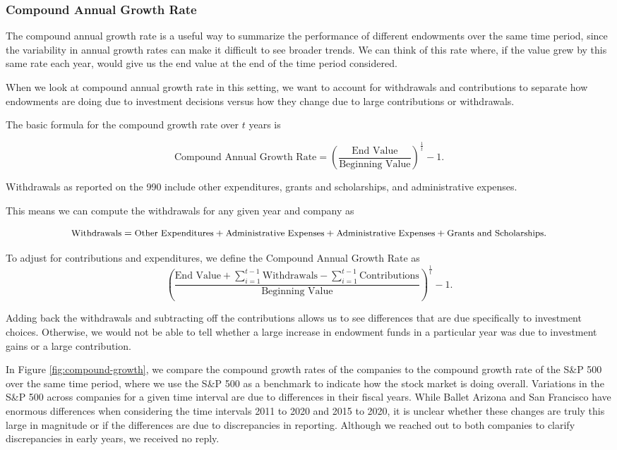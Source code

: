 \documentclass[Dance Data
Project,article,submit,moreauthors,pdftex]{mdpi}
\begin{document}
\hypertarget{compound-annual-growth-rate}{%
\subsubsection{Compound Annual Growth
Rate}\label{compound-annual-growth-rate}}

The compound annual growth rate is a useful way to summarize the
performance of different endowments over the same time period, since the
variability in annual growth rates can make it difficult to see broader
trends. We can think of this rate where, if the value grew by this same
rate each year, would give us the end value at the end of the time
period considered.

When we look at compound annual growth rate in this setting, we want to
account for withdrawals and contributions to separate how endowments are
doing due to investment decisions versus how they change due to large
contributions or withdrawals.

The basic formula for the compound growth rate over \(t\) years is

\[{\text{Compound Annual Growth Rate} = \left( \frac{\text{End Value}}{\text{Beginning Value}}\right)^{\frac{1}{t}}-1}.\]

Withdrawals as reported on the 990 include other expenditures, grants
and scholarships, and administrative expenses.

This means we can compute the withdrawals for any given year and company
as

\[\small{\text{Withdrawals} = \text{Other Expenditures} +\text{Administrative Expenses} +\text{Administrative Expenses} + \text{Grants and Scholarships}}.\]

To adjust for contributions and expenditures, we define the Compound
Annual Growth Rate as
\[{\left( \frac{\text{End Value} + \sum_{i=1}^{t-1} \text{Withdrawals} - \sum_{i=1}^{t-1} \text{Contributions}  }{\text{Beginning Value}} \right)^{\frac{1}{t}}-1}.\]

Adding back the withdrawals and subtracting off the contributions allows
us to see differences that are due specifically to investment choices.
Otherwise, we would not be able to tell whether a large increase in
endowment funds in a particular year was due to investment gains or a
large contribution.

In Figure \ref{fig:compound-growth}, we compare the compound growth
rates of the companies to the compound growth rate of the S\&P 500 over
the same time period, where we use the S\&P 500 as a benchmark to
indicate how the stock market is doing overall. Variations in the S\&P
500 across companies for a given time interval are due to differences in
their fiscal years. While Ballet Arizona and San Francisco have enormous
differences when considering the time intervals 2011 to 2020 and 2015 to
2020, it is unclear whether these changes are truly this large in
magnitude or if the differences are due to discrepancies in reporting.
Although we reached out to both companies to clarify discrepancies in
early years, we received no reply.
\end{document}
